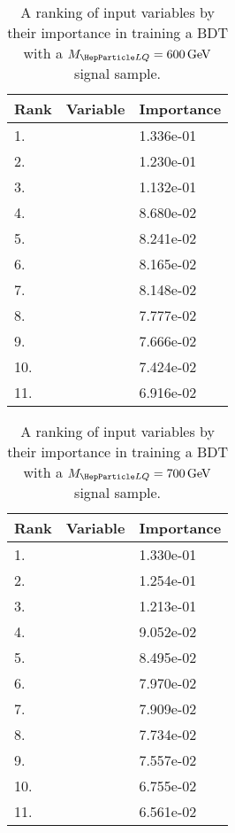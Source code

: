 \begin{table}[H]
	\caption{A ranking of input variables by their importance in training a BDT with a $\MLQ = \SI{600}{GeV}$ signal sample.}
	\begin{center}
		\begin{tabular}{lll} \hline \hline
			Rank & Variable & Importance  \\ \hline
			1. & \MujTwo & 1.336e-01 \\
			2. & \MujOne & 1.230e-01 \\
			3. & \ST & 1.132e-01 \\
			4. & \Muujj & 8.680e-02 \\
			5. & \ptof{\PmuTwo} & 8.241e-02 \\
			6. & \ptof{\PjOne} & 8.165e-02 \\
			7. & \ptof{\PmuOne} & 8.148e-02 \\
			8. & \MET & 7.777e-02 \\
			9. & \DRof{\PmuOne+\PmuTwo}{\PjOne} & 7.666e-02 \\
			10. & \Muu & 7.424e-02 \\
			11. & \ptof{\PjTwo} & 6.916e-02 \\ \hline \hline
		\end{tabular}
		\label{tab:bdtRank600}
	\end{center}
\end{table}

\begin{table}[H]
	\caption{A ranking of input variables by their importance in training a BDT with a $\MLQ = \SI{700}{GeV}$ signal sample.}
	\begin{center}
		\begin{tabular}{lll} \hline \hline
			Rank & Variable & Importance  \\ \hline
			1. & \MujOne & 1.330e-01 \\
			2. & \MujTwo & 1.254e-01 \\
			3. & \ST & 1.213e-01 \\
			4. & \Muujj & 9.052e-02 \\
			5. & \ptof{\PjOne} & 8.495e-02 \\
			6. & \ptof{\PmuTwo} & 7.970e-02 \\
			7. & \ptof{\PjTwo} & 7.909e-02 \\
			8. & \ptof{\PmuOne} & 7.734e-02 \\
			9. & \MET & 7.557e-02 \\
			10. & \DRof{\PmuOne+\PmuTwo}{\PjOne} & 6.755e-02 \\
			11. & \Muu & 6.561e-02 \\ \hline \hline
		\end{tabular}
		\label{tab:bdtRank700}
	\end{center}
\end{table}

